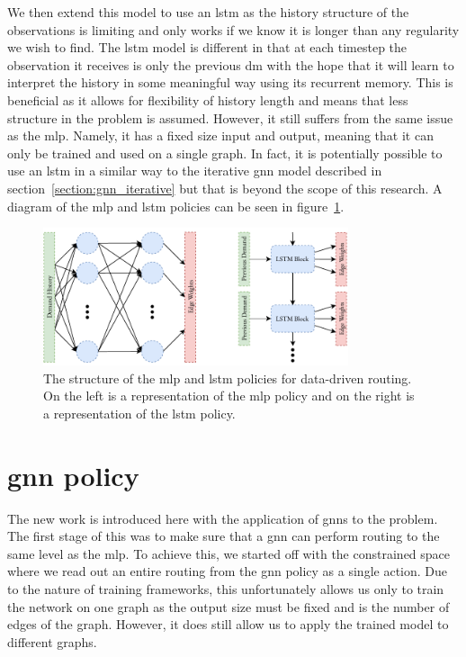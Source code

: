 We then extend this model to use an \acf{lstm}\cite{hochreiter1997long} as the history structure of the observations is limiting and only works if we know it is longer than any regularity we wish to find. The \ac{lstm} model is different in that at each timestep the observation it receives is only the previous \ac{dm} with the hope that it will learn to interpret the history in some meaningful way using its recurrent memory. This is beneficial as it allows for flexibility of history length and means that less structure in the problem is assumed. However, it still suffers from the same issue as the \ac{mlp}. Namely, it has a fixed size input and output, meaning that it can only be trained and used on a single graph. In fact, it is potentially possible to use an \ac{lstm} in a similar way to the iterative \ac{gnn} model described in section~\ref{section:gnn_iterative} but that is beyond the scope of this research. A diagram of the \ac{mlp} and \ac{lstm} policies can be seen in figure~\ref{fig:mlp_lstm}.

\begin{figure}
    \centering
    \includegraphics[width=0.8\textwidth]{figures/mlp_lstm.pdf}
    \caption{The structure of the \ac{mlp} and \ac{lstm} policies for data-driven routing. On the left is a representation of the \ac{mlp} policy and on the right is a representation of the \ac{lstm} policy.}
    \label{fig:mlp_lstm}
\end{figure}


\section{\ac{gnn} policy}
\label{section:gnn_policy}
The new work is introduced here with the application of \acp{gnn} to the problem. The first stage of this was to make sure that a \ac{gnn} can perform routing to the same level as the \ac{mlp}. To achieve this, we started off with the constrained space where we read out an entire routing from the \ac{gnn} policy as a single action. Due to the nature of training frameworks, this unfortunately allows us only to train the network on one graph as the output size must be fixed and is the number of edges of the graph. However, it does still allow us to apply the trained model to different graphs.

